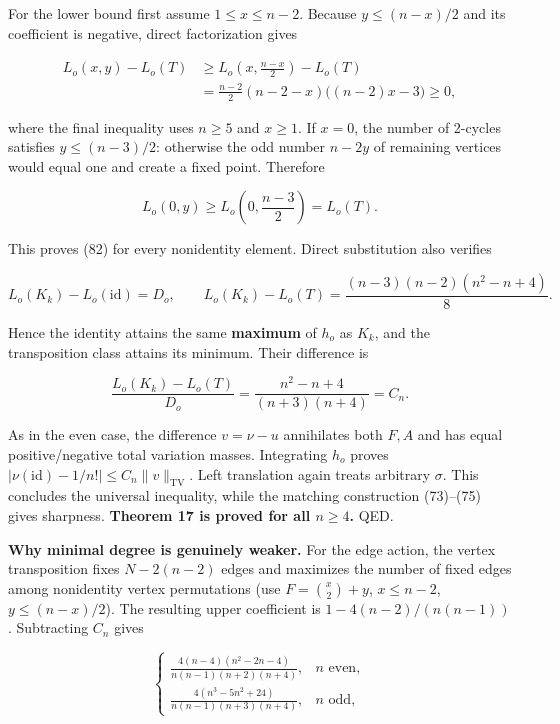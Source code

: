\documentclass[
  11pt,
]{article}
\begin{document}
For the lower bound first assume \(1\le x\le n-2\). Because
\(y\le(n-x)/2\) and its coefficient is negative, direct factorization
gives

\[
\begin{aligned}
L_o(x,y)-L_o(T)
&\ge L_o\!\left(x,\frac{n-x}{2}\right)-L_o(T)\\
&=\frac{n-2}{2}(n-2-x)\big((n-2)x-3\big)\ge0,
\end{aligned}\tag{83}
\]

where the final inequality uses \(n\ge5\) and \(x\ge1\). If \(x=0\), the
number of 2-cycles satisfies \(y\le(n-3)/2\): otherwise the odd number
\(n-2y\) of remaining vertices would equal one and create a fixed point.
Therefore

\[
L_o(0,y)\ge L_o\!\left(0,\frac{n-3}{2}\right)=L_o(T). \tag{84}
\]

This proves (82) for every nonidentity element. Direct substitution also
verifies

\[
L_o(K_k)-L_o(\mathrm{id})=D_o,\qquad
L_o(K_k)-L_o(T)=
\frac{(n-3)(n-2)(n^2-n+4)}8. \tag{85}
\]

Hence the identity attains the same \textbf{maximum} of \(h_o\) as
\(K_k\), and the transposition class attains its minimum. Their
difference is

\[
\frac{L_o(K_k)-L_o(T)}{D_o}
=\frac{n^2-n+4}{(n+3)(n+4)}=C_n. \tag{86}
\]

As in the even case, the difference \(v=\nu-u\) annihilates both \(F,A\)
and has equal positive/negative total variation masses. Integrating
\(h_o\) proves
\(\left|\nu(\mathrm{id})-1/n!\right|\le C_n\|v\|_{\mathrm{TV}}\). Left
translation again treats arbitrary \(\sigma\). This concludes the
universal inequality, while the matching construction (73)--(75) gives
sharpness. \textbf{Theorem 17 is proved for all \(n\ge4\).} QED.

\textbf{Why minimal degree is genuinely weaker.} For the edge action,
the vertex transposition fixes \(N-2(n-2)\) edges and maximizes the
number of fixed edges among nonidentity vertex permutations (use
\(F=\binom x2+y\), \(x\le n-2\), \(y\le(n-x)/2\)). The resulting upper
coefficient is \(1-4(n-2)/(n(n-1))\). Subtracting \(C_n\) gives

\[
\begin{cases}
\displaystyle\frac{4(n-4)(n^2-2n-4)}{n(n-1)(n+2)(n+4)},&n\text{ even},\\[5pt]
\displaystyle\frac{4(n^3-5n^2+24)}{n(n-1)(n+3)(n+4)},&n\text{ odd},
\end{cases}
\]
\end{document}

